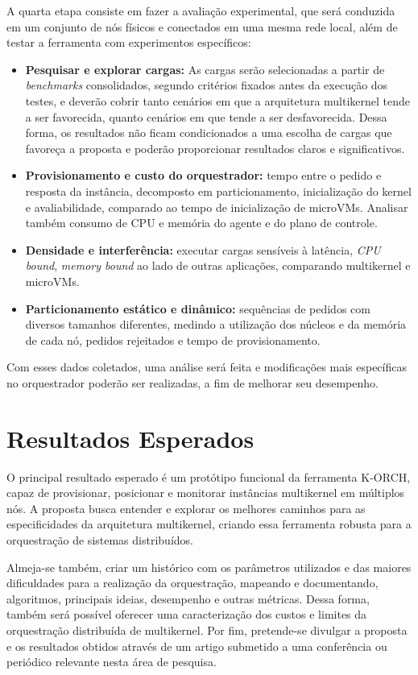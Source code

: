 \documentclass[12pt]{article}
\begin{document}
A quarta etapa consiste em fazer a avaliação experimental, que será conduzida em um conjunto de nós físicos e conectados em
uma mesma rede local, além de testar a ferramenta com experimentos específicos:
\begin{itemize}
  \item \textbf{Pesquisar e explorar cargas:} As cargas serão selecionadas a partir de \textit{benchmarks} consolidados, segundo
  critérios fixados antes da execução dos testes, e deverão cobrir tanto cenários em que a arquitetura multikernel tende a
  ser favorecida, quanto cenários em que tende a ser desfavorecida.
  Dessa forma, os resultados não ficam condicionados a uma escolha de cargas que favoreça a proposta e poderão proporcionar resultados claros e significativos.
  \item \textbf{Provisionamento e custo do orquestrador:} tempo entre o pedido e resposta da instância,
  decomposto em particionamento, inicialização do kernel e avaliabilidade, comparado ao tempo de
  inicialização de microVMs. Analisar também consumo de CPU e memória do agente e do plano de controle.
  \item \textbf{Densidade e interferência:} executar cargas sensíveis à latência, \textit{CPU bound}, \textit{memory bound} ao lado de outras
  aplicações, comparando multikernel e microVMs.
  \item \textbf{Particionamento estático e dinâmico:} sequências de pedidos com diversos tamanhos diferentes,
  medindo a utilização dos núcleos e da memória de cada nó, pedidos rejeitados e tempo de provisionamento.
\end{itemize}

Com esses dados coletados, uma análise será feita e modificações mais específicas no orquestrador poderão ser realizadas,
a fim de melhorar seu desempenho.

\section{Resultados Esperados} \label{sec:results}

O principal resultado esperado é um protótipo funcional da ferramenta K-ORCH, capaz de provisionar, posicionar e monitorar instâncias
multikernel em múltiplos nós.
A proposta busca entender e explorar os melhores caminhos para as especificidades da arquitetura multikernel, criando
essa ferramenta robusta para a orquestração de sistemas distribuídos.

Almeja-se também, criar um histórico com os parâmetros utilizados e das maiores dificuldades para a realização da orquestração,
mapeando e documentando, algoritmos, principais ideias, desempenho e outras métricas.
Dessa forma, também será possível oferecer uma caracterização dos custos e limites da orquestração distribuída de multikernel.
Por fim, pretende-se divulgar a proposta e os resultados obtidos através de um artigo submetido
a uma conferência ou periódico relevante nesta área de pesquisa.
\end{document}
